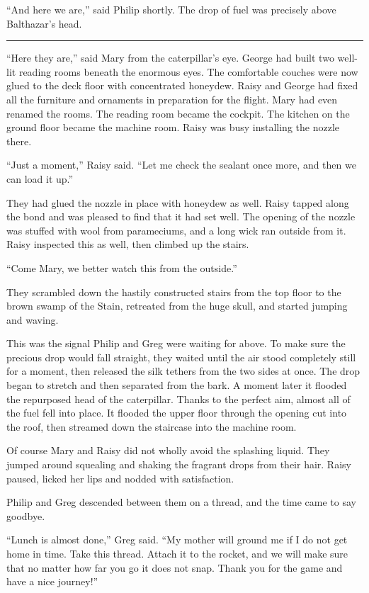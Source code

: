\documentclass[10pt, draft]{memoir}
\renewcommand{\pfbreakdisplay}{\bigskip \ding{166} \bigskip}
\newcommand{\secbreak}{\fancybreak{\pfbreakdisplay}}
\begin{document}
``And here we are,'' said Philip shortly. The drop of fuel was precisely above
Balthazar's head.

\secbreak

``Here they are,'' said Mary from the caterpillar's eye. George had built two
well-lit reading rooms beneath the enormous eyes. The comfortable couches were
now glued to the deck floor with concentrated honeydew. Raisy and George had
fixed all the furniture and ornaments in preparation for the flight. Mary had
even renamed the rooms. The reading room became the cockpit. The kitchen on the
ground floor became the machine room. Raisy was busy installing the nozzle
there.

``Just a moment,'' Raisy said. ``Let me check the sealant once more, and then
we can load it up.''

They had glued the nozzle in place with honeydew as well. Raisy tapped along
the bond and was pleased to find that it had set well. The opening of the
nozzle was stuffed with wool from parameciums, and a long wick ran outside from
it. Raisy inspected this as well, then climbed up the stairs.

``Come Mary, we better watch this from the outside.''

They scrambled down the hastily constructed stairs from the top floor to the
brown swamp of the Stain, retreated from the huge skull, and started jumping
and waving.

This was the signal Philip and Greg were waiting for above. To make sure the
precious drop would fall straight, they waited until the air stood completely
still for a moment, then released the silk tethers from the two sides at once.
The drop began to stretch and then separated from the bark. A moment later it
flooded the repurposed head of the caterpillar. Thanks to the perfect aim,
almost all of the fuel fell into place. It flooded the upper floor through the
opening cut into the roof, then streamed down the staircase into the machine
room.

Of course Mary and Raisy did not wholly avoid the splashing liquid. They jumped
around squealing and shaking the fragrant drops from their hair. Raisy paused,
licked her lips and nodded with satisfaction.

Philip and Greg descended between them on a thread, and the time came to say
goodbye.

``Lunch is almost done,'' Greg said. ``My mother will ground me if I do not get
home in time. Take this thread. Attach it to the rocket, and we will make sure
that no matter how far you go it does not snap. Thank you for the game and have
a nice journey!''
\end{document}
